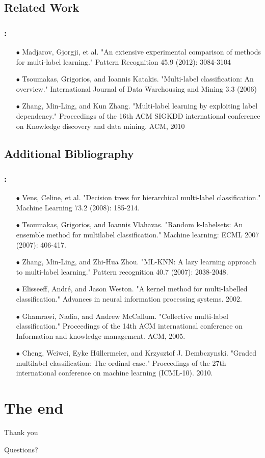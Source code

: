 \documentclass{beamer}
\begin{document}
\subsection{Related Work}
\begin{frame}
\frametitle{\insertsection : \insertsubsection}
\begin{itemize}
\item[$\bullet$] Madjarov, Gjorgji, et al. "An extensive experimental comparison of methods for multi-label learning." Pattern Recognition 45.9 (2012): 3084-3104
\item[$\bullet$] Tsoumakas, Grigorios, and Ioannis Katakis. "Multi-label classification: An overview." International Journal of Data Warehousing and Mining 3.3 (2006)
\item[$\bullet$] Zhang, Min-Ling, and Kun Zhang. "Multi-label learning by exploiting label dependency." Proceedings of the 16th ACM SIGKDD international conference on Knowledge discovery and data mining. ACM, 2010
\end{itemize}
\end{frame}

\subsection{Additional Bibliography}
\begin{frame}
\frametitle{\insertsection : \insertsubsection}
\begin{itemize}
\item[$\bullet$] Vens, Celine, et al. "Decision trees for hierarchical multi-label classification." Machine Learning 73.2 (2008): 185-214.
\item[$\bullet$] Tsoumakas, Grigorios, and Ioannis Vlahavas. "Random k-labelsets: An ensemble method for multilabel classification." Machine learning: ECML 2007 (2007): 406-417.
\item[$\bullet$] Zhang, Min-Ling, and Zhi-Hua Zhou. "ML-KNN: A lazy learning approach to multi-label learning." Pattern recognition 40.7 (2007): 2038-2048.
\item[$\bullet$] Elisseeff, André, and Jason Weston. "A kernel method for multi-labelled classification." Advances in neural information processing systems. 2002.
\item[$\bullet$]  Ghamrawi, Nadia, and Andrew McCallum. "Collective multi-label classification." Proceedings of the 14th ACM international conference on Information and knowledge management. ACM, 2005.
\item[$\bullet$]  Cheng, Weiwei, Eyke Hüllermeier, and Krzysztof J. Dembczynski. "Graded multilabel classification: The ordinal case." Proceedings of the 27th international conference on machine learning (ICML-10). 2010.
\end{itemize}
\end{frame}
\section{The end}
\begin{frame}
\Huge{\centerline{Thank you}}
\Huge{\centerline{Questions?}}
\end{frame}
\end{document}
